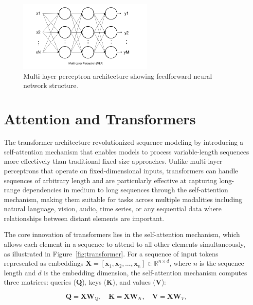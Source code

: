 \begin{figure}[htbp]
\centering
\includegraphics[width=0.6\textwidth]{../Images/mlp.png}
\caption{Multi-layer perceptron architecture showing feedforward neural network structure.}
\label{fig:mlp}
\end{figure}

\section{Attention and Transformers}

The transformer architecture revolutionized sequence modeling by introducing a self-attention mechanism that enables models to process variable-length sequences more effectively than traditional fixed-size approaches. Unlike multi-layer perceptrons that operate on fixed-dimensional inputs, transformers can handle sequences of arbitrary length and are particularly effective at capturing long-range dependencies in medium to long sequences through the self-attention mechanism, making them suitable for tasks across multiple modalities including natural language, vision, audio, time series, or any sequential data where relationships between distant elements are important.

The core innovation of transformers lies in the self-attention mechanism, which allows each element in a sequence to attend to all other elements simultaneously, as illustrated in Figure~\ref{fig:transformer}. For a sequence of input tokens represented as embeddings $\mathbf{X} = [\mathbf{x}_1, \mathbf{x}_2, \ldots, \mathbf{x}_n] \in \mathbb{R}^{n \times d}$, where $n$ is the sequence length and $d$ is the embedding dimension, the self-attention mechanism computes three matrices: queries ($\mathbf{Q}$), keys ($\mathbf{K}$), and values ($\mathbf{V}$):

\begin{equation}
\mathbf{Q} = \mathbf{X}\mathbf{W}_Q, \quad \mathbf{K} = \mathbf{X}\mathbf{W}_K, \quad \mathbf{V} = \mathbf{X}\mathbf{W}_V,
\end{equation}

